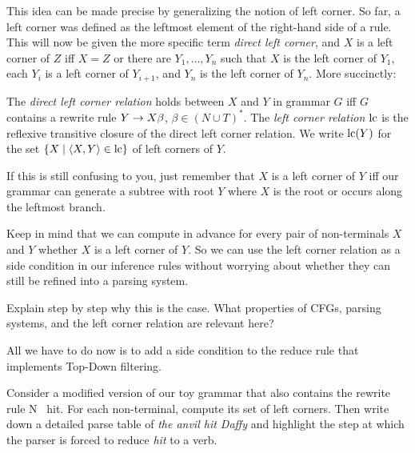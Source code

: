 This idea can be made precise by generalizing the notion of left corner.
So far, a left corner was defined as the leftmost element of the right-hand side of a rule.
This will now be given the more specific term \emph{direct left corner}, and $X$ is a left corner of $Z$ iff $X = Z$ or there are $Y_1, \ldots, Y_n$ such that $X$ is the left corner of $Y_1$, each $Y_i$ is a left corner of $Y_{i+1}$, and $Y_n$ is the left corner of $Y_n$.
More succinctly:
%
\begin{definition}
    The \emph{direct left corner relation} holds between $X$ and $Y$ in grammar $G$ iff $G$ contains a rewrite rule $Y \rewrite X \beta$, $\beta \in (N \cup T)^*$.
    The \emph{left corner relation} $\LeftCorner$ is the reflexive transitive closure of the direct left corner relation.
    We write $\LeftCorner(Y)$ for the set $\setof{X \mid \tuple{X,Y} \in \LeftCorner}$ of left corners of $Y$.
\end{definition}
%
If this is still confusing to you, just remember that $X$ is a left corner of $Y$ iff our grammar can generate a subtree with root $Y$ where $X$ is the root or occurs along the leftmost branch.

Keep in mind that we can compute in advance for every pair of non-terminals $X$ and $Y$ whether $X$ is a left corner of $Y$.
So we can use the left corner relation as a side condition in our inference rules without worrying about whether they can still be refined into a parsing system.
%
\begin{exercise}
    Explain step by step why this is the case.
    What properties of CFGs, parsing systems, and the left corner relation are relevant here?
\end{exercise}
%
All we have to do now is to add a side condition to the reduce rule that implements Top-Down filtering.
%
\begin{prooftree}
\end{prooftree}
%
\begin{exercise}
    Consider a modified version of our toy grammar that also contains the rewrite rule N \rewrite\ hit.
    For each non-terminal, compute its set of left corners.
    Then write down a detailed parse table of \emph{the anvil hit Daffy} and highlight the step at which the parser is forced to reduce \emph{hit} to a verb.
\end{exercise}


